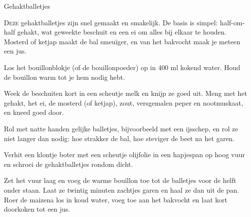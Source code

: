 \begin{recipe}{Gehaktballetjes}


\lettrine{D}{eze} gehaktballetjes zijn snel gemaakt en smakelijk. De basis
is simpel: half-om-half gehakt, wat geweekte beschuit en een ei om alles
bij elkaar te houden. Mosterd of ketjap maakt de bal smeuïger, en van het
bakvocht maak je meteen een jus.

\begin{ingredients}
\end{ingredients}

\begin{steps}
  \item Los het bouillonblokje (of de bouillonpoeder) op in 400 ml kokend
        water. Houd de bouillon warm tot je hem nodig hebt.
  \item Week de beschuiten kort in een scheutje melk en knijp ze goed uit.
        Meng met het gehakt, het ei, de mosterd (of ketjap), zout,
        versgemalen peper en nootmuskaat, en kneed goed door.
  \item Rol met natte handen gelijke balletjes, bijvoorbeeld met een
        ijsschep, en rol ze niet langer dan nodig: hoe strakker de bal, hoe
        steviger de beet na het garen.
  \item Verhit een klontje boter met een scheutje olijfolie in een
        hapjespan op hoog vuur en schroei de gehaktballetjes rondom dicht.
  \item Zet het vuur laag en voeg de warme bouillon toe tot de balletjes
        voor de helft onder staan. Laat ze twintig minuten zachtjes garen en
        haal ze dan uit de pan. Roer de maizena los in koud water, voeg toe
        aan het bakvocht en laat kort doorkoken tot een jus.
\end{steps}
\end{recipe}
